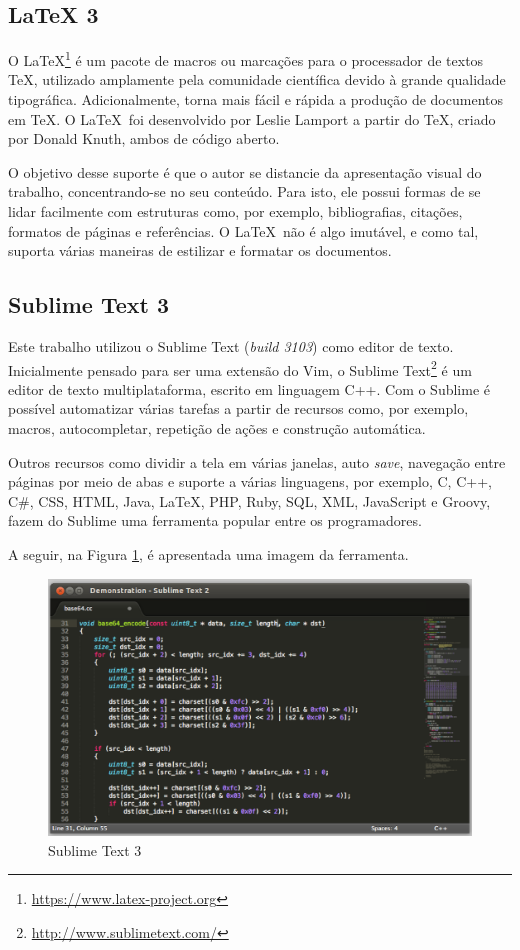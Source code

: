 \subsection{LaTeX 3}

O \LaTeX\footnote{\url{https://www.latex-project.org}} é um pacote de macros ou marcações para o processador de textos \TeX, utilizado amplamente pela comunidade científica devido à grande qualidade tipográfica. Adicionalmente, torna mais fácil e rápida a produção de documentos em \TeX. O \LaTeX\ foi desenvolvido por Leslie Lamport a partir do \TeX, criado por Donald Knuth, ambos de código aberto.

O objetivo desse suporte é que o autor se distancie da apresentação visual do trabalho, concentrando-se no seu conteúdo. Para isto, ele possui formas de se lidar facilmente com estruturas como, por exemplo, bibliografias, citações, formatos de páginas e referências. O \LaTeX\ não é algo imutável, e como tal, suporta várias maneiras de estilizar e formatar os documentos.

\subsection{Sublime Text 3}

Este trabalho utilizou o Sublime Text (\textit{build 3103}) como editor de texto. Inicialmente pensado para ser uma extensão do Vim, o Sublime Text\footnote{\url{http://www.sublimetext.com/}} é um editor de texto multiplataforma, escrito em linguagem C++. Com o Sublime é possível automatizar várias tarefas a partir de recursos como, por exemplo, macros, autocompletar, repetição de ações e construção automática.

Outros recursos como dividir a tela em várias janelas, auto \textit{save}, navegação entre páginas por meio de abas e suporte a várias linguagens, por exemplo, C, C++, C\#, CSS, HTML, Java, \LaTeX, PHP, Ruby, SQL, XML, JavaScript e Groovy, fazem do Sublime uma ferramenta popular entre os programadores.

A seguir, na Figura \ref{sublime}, é apresentada uma imagem da ferramenta.

\begin{figure}[!h]
	\centering
	\includegraphics[scale=0.35]{figuras/suporte_tecnologico/sublime.eps}
	\caption{Sublime Text 3}
	\label{sublime}
\end{figure}

